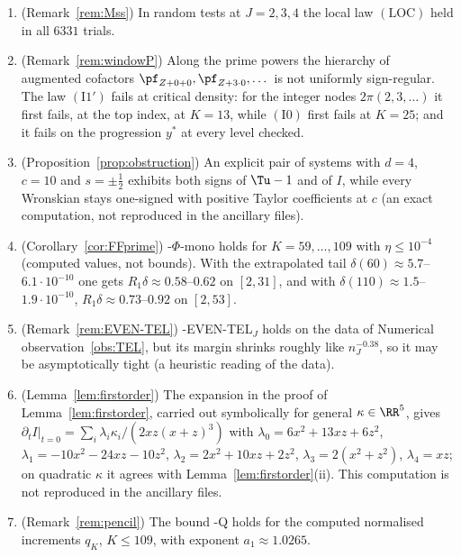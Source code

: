 \begin{observation}\label{obs:misc}
\begin{enumerate}[label=\textup{(\alph*)}]
\item \textup{(Remark~\ref{rem:Mss})} In random tests at $J=2,3,4$ the local law $(\mathrm{LOC})$ held in all $6331$ trials.
\item \textup{(Remark~\ref{rem:windowP})} Along the prime powers the hierarchy of augmented cofactors
$\pf_{Z+0+0},\pf_{Z+3\cdot0},\dots$ is not uniformly sign-regular. The law $(\mathrm{I1}')$ fails at critical density: for the
integer nodes $2\pi(2,3,\dots)$ it first fails, at the top index, at $K=13$, while $(\mathrm{I0})$ first fails at $K=25$; and it
fails on the progression $y^*$ at every level checked.
\item \textup{(Proposition~\ref{prop:obstruction})} An explicit pair of systems with $d=4$, $c=10$ and $s=\pm\frac12$ exhibits both
signs of $\Tu-1$ and of $I$, while every Wronskian stays one-signed with positive Taylor coefficients at $c$ (an exact
computation, not reproduced in the ancillary files).
\item \textup{(Corollary~\ref{cor:FFprime})} \hyp{$\Phi$-mono} holds for $K=59,\dots,109$ with $\eta\le10^{-4}$ (computed values, not
bounds). With the extrapolated tail $\delta(60)\approx5.7$--$6.1\cdot10^{-10}$ one gets $R_1\delta\approx0.58$--$0.62$ on $[2,31]$,
and with $\delta(110)\approx1.5$--$1.9\cdot10^{-10}$, $R_1\delta\approx0.73$--$0.92$ on $[2,53]$.
\item \textup{(Remark~\ref{rem:EVEN-TEL})} \hyp{EVEN-TEL$_J$} holds on the data of Numerical observation~\ref{obs:TEL}, but its margin
shrinks roughly like $n_J^{-0.38}$, so it may be asymptotically tight (a heuristic reading of the data).
\item \textup{(Lemma~\ref{lem:firstorder})} The expansion in the proof of Lemma~\ref{lem:firstorder}, carried out symbolically for
general $\kappa\in\RR^5$, gives $\partial_tI|_{t=0}=\sum_i\lambda_i\kappa_i/(2xz(x+z)^3)$ with $\lambda_0=6x^2+13xz+6z^2$,
$\lambda_1=-10x^2-24xz-10z^2$, $\lambda_2=2x^2+10xz+2z^2$, $\lambda_3=2(x^2+z^2)$, $\lambda_4=xz$; on quadratic $\kappa$ it agrees
with Lemma~\ref{lem:firstorder}(ii). This computation is not reproduced in the ancillary files.
\item \textup{(Remark~\ref{rem:pencil})} The bound \hyp{Q} holds for the computed normalised increments $q_K$, $K\le109$, with
exponent $a_1\approx1.0265$.
\end{enumerate}
\end{observation}
